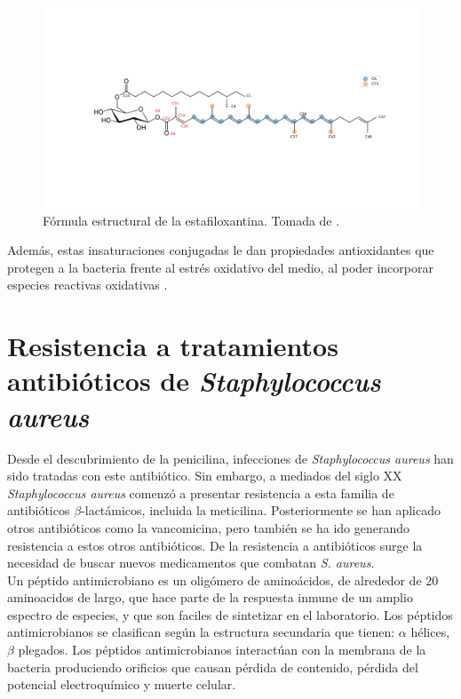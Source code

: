 \begin{figure}[h]
\begin{center}
  \includegraphics[scale=0.4]{Kap2/stx_problems.png}
  \caption{F\'{o}rmula estructural de la estafiloxantina. Tomada de \cite{MelendezDelgado2018StudyingBilayers}.}
  \label{fig:stx}
\end{center}
\end{figure}
 Adem\'{a}s, estas insaturaciones conjugadas le dan propiedades antioxidantes que protegen a la bacteria frente al estr\'{e}s oxidativo del medio, al poder incorporar especies reactivas oxidativas \cite{Nelson2011}.
\section{Resistencia a tratamientos antibi\'{o}ticos de \textit{Staphylococcus aureus}}\label{ss:anti}
Desde el descubrimiento de la penicilina, infecciones de \textit{Staphylococcus aureus} han sido tratadas con este antibi\'{o}tico. Sin embargo, a mediados del siglo XX \textit{Staphylococcus aureus} comenz\'{o} a presentar resistencia a esta familia de antibi\'{o}ticos $\beta$-lact\'{a}micos, incluida la meticilina. Posteriormente se han aplicado otros antibi\'{o}ticos como la vancomicina, pero tambi\'{e}n se ha ido generando  resistencia a estos otros antibi\'{o}ticos.  De la resistencia a antibi\'{o}ticos surge la necesidad de buscar nuevos medicamentos que combatan \textit{S. aureus}.\\

Un p\'eptido antimicrobiano es  un olig\'omero de amino\'acidos, de alrededor de 20 aminoacidos de largo, que hace parte de la respuesta inmune de un amplio espectro de especies, y que son faciles de sintetizar en el laboratorio. Los p\'{e}ptidos antimicrobianos se clasifican seg\'{u}n la estructura secundaria que tienen: $\alpha$ h\'elices, $\beta$ plegados.   Los p\'eptidos antimicrobianos interact\'uan con la membrana de la bacteria produciendo orificios que causan p\'erdida de contenido, p\'{e}rdida del potencial electroqu\'{i}mico y muerte celular.\\

